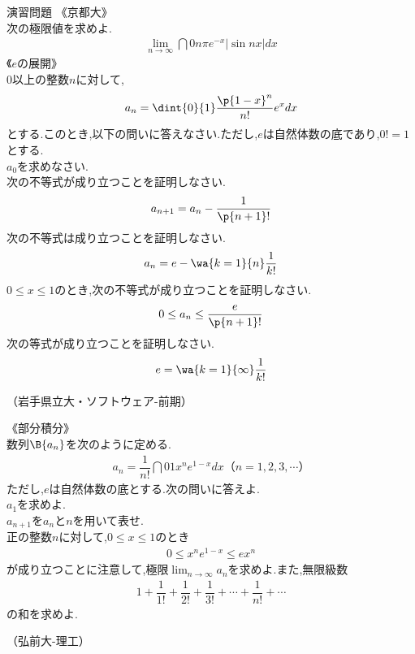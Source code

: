 \documentclass[dvipdfmx,10pt,fleqn,a4paper,twocolumn]{jsarticle}
\newcommand{\midashikakko}[1]{《#1》}%
\newcommand{\miginote}[1]{%
  \par\noindent\hfill（#1）\par
}
\begin{document}
\begin{enshumondai}
  [c]{演習問題}
  \midashikakko{京都大}\\
  次の極限値を求めよ.
  \begin{align*}
    \lim_{n\to\infty}\dint{0}{n\pi}e^{-x}\left|\sin nx\right|dx
  \end{align*}
  \midashikakko{$e$の展開}\\%
  0以上の整数$n$に対して,
  \begin{align*}
    a_n=\dint{0}{1}\dfrac{\p{1-x}^n}{n!}e^xdx
  \end{align*}
  とする.このとき,以下の問いに答えなさい.ただし,$e$は自然体数の底であり,$0!=1$とする.\\
  \kakkoichi\quad $a_0$を求めなさい.\\
  \kakkoni\quad 次の不等式が成り立つことを証明しなさい.
  \begin{align*}
    a_{n+1}=a_n-\dfrac{1}{\p{n+1}!}
  \end{align*}
  \kakkosan\quad 次の不等式は成り立つことを証明しなさい.
  \begin{align*}
    a_n=e-\wa{k=1}{n}\dfrac{1}{k!}
  \end{align*}
  \kakkoshi\quad $0\leq x\leq1$のとき,次の不等式が成り立つことを証明しなさい.
  \begin{align*}
    0\leq a_n\leq\dfrac{e}{\p{n+1}!}
  \end{align*}
  \kakkogo\quad 次の等式が成り立つことを証明しなさい.
  \begin{align*}
    e=\wa{k=1}{\infty}\dfrac{1}{k!}
  \end{align*}
  \miginote{岩手県立大・ソフトウェア-前期}
  \midashikakko{部分積分}\\%
  数列$\B{a_n}$を次のように定める.
  \begin{align*}
    a_n=\dfrac{1}{n!}\dint{0}{1}x^ne^{1-x}dx（n=1,2,3,\cdots）
  \end{align*}
  ただし,$e$は自然体数の底とする.次の問いに答えよ.\\
  \kakkoichi\quad$a_1$を求めよ.\\
  \kakkoni\quad$a_{n+1}をa_n$と$n$を用いて表せ.\\
  \kakkosan\quad 正の整数$n$に対して,$0\leq x\leq1$のとき
  \begin{align*}
    0\leq x^ne^{1-x}\leq ex^n
  \end{align*}
  が成り立つことに注意して,極限$\lim_{n\to\infty}a_n$を求めよ.また,無限級数
  \begin{align*}
    1+\dfrac{1}{1!}+\dfrac{1}{2!}+\dfrac{1}{3!}+\cdots+\dfrac{1}{n!}+\cdots
  \end{align*}
  の和を求めよ.
  \miginote{弘前大-理工}
\end{enshumondai}
\end{document}

